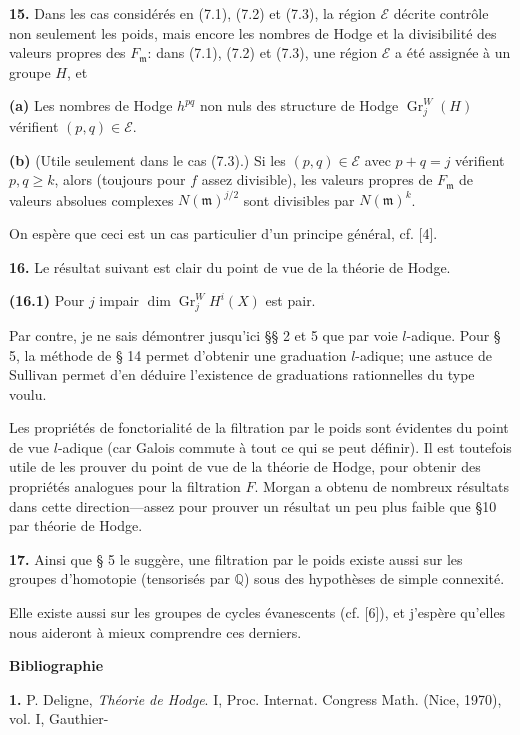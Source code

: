 \documentclass[8pt]{extarticle}
\newcommand{\EndSourcePage}{\clearpage}
\newcommand{\NumPara}[1]{\par\noindent\textbf{#1}\enspace}
\newcommand{\Q}{\mathbb{Q}}
\newcommand{\Gr}{\operatorname{Gr}}
\newcommand{\region}{\mathscr{E}}
\begin{document}
\NumPara{15.} Dans les cas considérés en (7.1), (7.2) et (7.3), la région \(\region\) décrite contrôle non seulement les poids, mais encore les nombres de Hodge et la divisibilité des valeurs propres des \(F_{\mathfrak m}\): dans (7.1), (7.2) et (7.3), une région \(\region\) a été assignée à un groupe \(H\), et

\NumPara{(a)} Les nombres de Hodge \(h^{pq}\) non nuls des structure de Hodge \(\Gr_j^W(H)\) vérifient \((p,q)\in\region\).

\NumPara{(b)} (Utile seulement dans le cas (7.3).) Si les \((p,q)\in\region\) avec \(p+q=j\) vérifient \(p,q\ge k\), alors (toujours pour \(f\) assez divisible), les valeurs propres de \(F_{\mathfrak m}\) de valeurs absolues complexes \(N(\mathfrak m)^{j/2}\) sont divisibles par \(N(\mathfrak m)^k\).

On espère que ceci est un cas particulier d'un principe général, cf. [4].

\NumPara{16.} Le résultat suivant est clair du point de vue de la théorie de Hodge.

\NumPara{(16.1)} Pour \(j\) impair \(\dim\Gr_j^W H^i(X)\) est pair.

Par contre, je ne sais démontrer jusqu'ici §§ 2 et 5 que par voie \(l\)-adique. Pour § 5, la méthode de § 14 permet d'obtenir une graduation \(l\)-adique; une astuce de Sullivan permet d'en déduire l'existence de graduations rationnelles du type voulu.

Les propriétés de fonctorialité de la filtration par le poids sont évidentes du point de vue \(l\)-adique (car Galois commute à tout ce qui se peut définir). Il est toutefois utile de les prouver du point de vue de la théorie de Hodge, pour obtenir des propriétés analogues pour la filtration \(F\). Morgan a obtenu de nombreux résultats dans cette direction---assez pour prouver un résultat un peu plus faible que §10 par théorie de Hodge.

\NumPara{17.} Ainsi que § 5 le suggère, une filtration par le poids existe aussi sur les groupes d'homotopie (tensorisés par \(\Q\)) sous des hypothèses de simple connexité.

Elle existe aussi sur les groupes de cycles évanescents (cf. [6]), et j'espère qu'elles nous aideront à mieux comprendre ces derniers.

\begin{center}\sffamily\bfseries Bibliographie\end{center}

\noindent\textbf{1.} P. Deligne, \emph{Théorie de Hodge}. I, Proc. Internat. Congress Math. (Nice, 1970), vol. I, Gauthier-
\EndSourcePage
\end{document}
